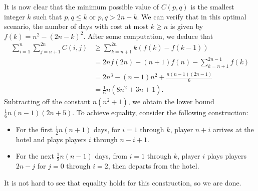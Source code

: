 It is now clear that the minimum possible value of $C(p,q)$ is the smallest integer $k$ such that $p,q\le k$ or $p,q>2n-k$. We can verify that in this optimal scenario, the number of days with cost at most $k\ge n$ is given by $f(k)=n^2-(2n-k)^2$. After some computation, we deduce that
\begin{align*}
    \sum_{i=1}^n\sum_{j=n+1}^{2n}C(i,j)&\ge\sum_{k=n+1}^{2n}k(f(k)-f(k-1))\\
    &=2nf(2n)-(n+1)f(n)-\sum_{k=n+1}^{2n-1}f(k)\\
    &=2n^3-(n-1)n^2+\frac{n(n-1)(2n-1)}6\\
    &=\frac16n\left(8n^2+3n+1\right).
\end{align*}
Subtracting off the constant $n(n^2+1)$, we obtain the lower bound $\frac16n(n-1)(2n+5)$. To achieve equality, consider the following construction:
\begin{itemize}
    \item For the first $\frac12n(n+1)$ days, for $i=1$ through $k$, player $n+i$ arrives at the hotel and plays players $i$ through $n-i+1$.
    \item For the next $\frac12n(n-1)$ days, from $i=1$ through $k$, player $i$ plays players $2n-j$ for $j=0$ through $i=2$, then departs from the hotel.
\end{itemize}
It is not hard to see that equality holds for this construction, so we are done.


